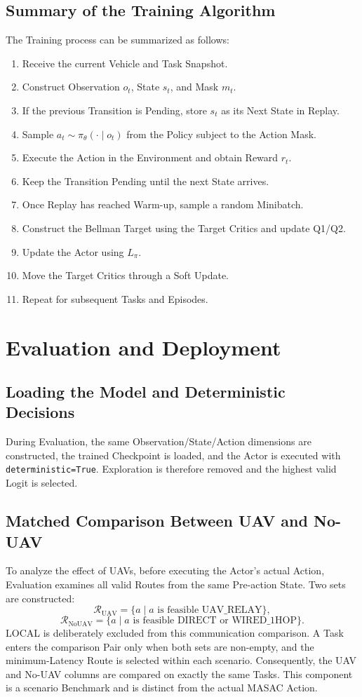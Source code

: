 \documentclass[a4paper,12pt]{article}
\newcommand{\code}[1]{\texttt{#1}}
\begin{document}
\subsection{Summary of the Training Algorithm}
The Training process can be summarized as follows:
\begin{enumerate}
    \item Receive the current Vehicle and Task Snapshot.
    \item Construct Observation $o_t$, State $s_t$, and Mask $m_t$.
    \item If the previous Transition is Pending, store $s_t$ as its Next State in Replay.
    \item Sample $a_t\sim\pi_\theta(\cdot\mid o_t)$ from the Policy subject to the Action Mask.
    \item Execute the Action in the Environment and obtain Reward $r_t$.
    \item Keep the Transition Pending until the next State arrives.
    \item Once Replay has reached Warm-up, sample a random Minibatch.
    \item Construct the Bellman Target using the Target Critics and update Q1/Q2.
    \item Update the Actor using $L_\pi$.
    \item Move the Target Critics through a Soft Update.
    \item Repeat for subsequent Tasks and Episodes.
\end{enumerate}

\section{Evaluation and Deployment}
\subsection{Loading the Model and Deterministic Decisions}
During Evaluation, the same Observation/State/Action dimensions are constructed, the trained Checkpoint is loaded, and the Actor is executed with \code{deterministic=True}. Exploration is therefore removed and the highest valid Logit is selected.

\subsection{Matched Comparison Between UAV and No-UAV}
To analyze the effect of UAVs, before executing the Actor's actual Action, Evaluation examines all valid Routes from the same Pre-action State. Two sets are constructed:
\[
\mathcal{R}_{\mathrm{UAV}}=
\{a\mid a\text{ is feasible UAV\_RELAY}\},
\]
\[
\mathcal{R}_{\mathrm{NoUAV}}=
\{a\mid a\text{ is feasible DIRECT or WIRED\_1HOP}\}.
\]
LOCAL is deliberately excluded from this communication comparison. A Task enters the comparison Pair only when both sets are non-empty, and the minimum-Latency Route is selected within each scenario. Consequently, the UAV and No-UAV columns are compared on exactly the same Tasks. This component is a scenario Benchmark and is distinct from the actual MASAC Action.
\end{document}
